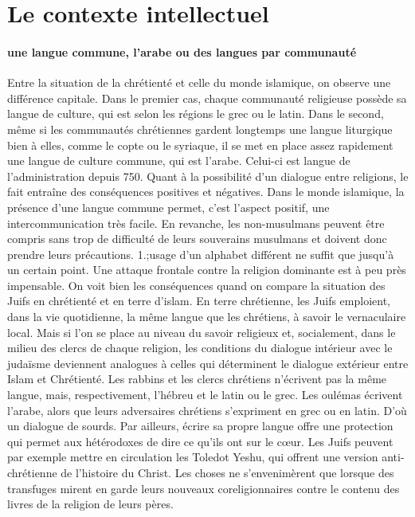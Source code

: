 \section{Le contexte intellectuel}

\paragraph{une langue commune, l'arabe ou des langues par communauté}
Entre la situation de la chrétienté et celle du monde islamique, on observe une différence capitale. Dans le premier cas, chaque communauté religieuse possède sa langue de culture, qui est selon les régions le grec ou le latin. Dans le second, même si les communautés chrétiennes gardent longtemps une langue liturgique bien à elles, comme le copte ou le syriaque, il se met en place assez rapidement une langue de culture commune, qui est l'arabe. Celui-ci est langue de l'administration depuis 750. Quant à la possibilité d'un dialogue entre religions, le fait entraîne des conséquences positives et négatives. Dans le monde islamique, la présence d'une langue commune permet, c'est l'aspect positif, une intercommunication très facile. En revanche, les non-musulmans peuvent être compris sans trop de difficulté de leurs souverains musulmans et doivent donc prendre leurs précautions. 1.;usage d'un alphabet différent ne suffit que jusqu'à un certain point. Une attaque frontale contre la religion dominante est à peu près impensable.
On voit bien les conséquences quand on compare la situation des Juifs en chrétienté et en terre d'islam. En terre chrétienne, les Juifs emploient, dans la vie quotidienne, la même langue que les chrétiens, à savoir le vernaculaire local. Mais si l'on se place au niveau du savoir religieux et, socialement, dans le milieu des clercs de chaque religion, les conditions du dialogue intérieur avec le judaïsme deviennent analogues à celles qui déterminent le dialogue extérieur entre Islam et Chrétienté. Les rabbins et les clercs chrétiens n'écrivent pas la même langue, mais, respectivement, l'hébreu et le latin ou le grec. Les oulémas écrivent l'arabe, alors que leurs adversaires chrétiens s'expriment en grec ou en latin. D'où un dialogue de sourds. Par ailleurs, écrire sa propre langue offre une protection qui permet aux hétérodoxes de dire ce qu'ils ont sur le cœur. Les Juifs peuvent par exemple mettre en circulation les Toledot Yeshu, qui offrent une version anti-chrétienne de l'histoire du Christ. Les choses ne s'envenimèrent que lorsque des transfuges mirent en garde leurs nouveaux coreligionnaires contre le contenu des livres de la religion de leurs pères.

